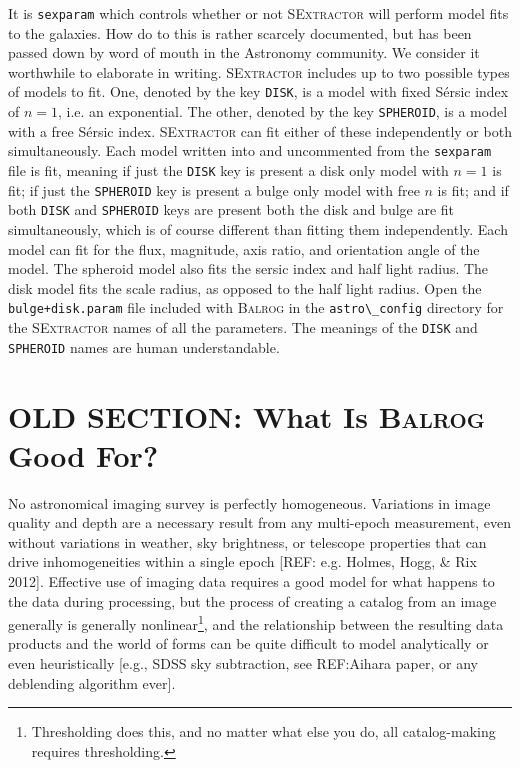 \documentclass[11pt]{book}
\newcommand{\codett}[1]{\lstinline{#1}}
\newcommand{\balrog}{\textsc{Balrog}}
\newcommand{\sex}{\textsc{SExtractor}}
\newcommand{\sersic}{S\'{e}rsic}
\begin{document}
It is \codett{sexparam} which controls whether or not \sex{} will perform model fits to the galaxies. 
How do to this is rather scarcely documented, but has been passed down by word of mouth in the Astronomy community. 
We consider it worthwhile to elaborate in writing.
\sex{} includes up to two possible types of models to fit.
One, denoted by the key \codett{DISK}, is a model with fixed \sersic{} index of $n=1$,
i.e. an exponential.
The other, denoted by the key \codett{SPHEROID}, is a model with a free \sersic{} index.
\sex{} can fit either of these independently or both simultaneously.
Each model written into and uncommented from the \codett{sexparam} file is fit,
meaning if just the \codett{DISK} key is present a disk only model with $n=1$ is fit;
if just the \codett{SPHEROID} key is present a bulge only model with free $n$ is fit;
and if both \codett{DISK} and \codett{SPHEROID} keys are present both the
disk and bulge are fit simultaneously, which is of course different than fitting them independently.
Each model can fit for the flux, magnitude, axis ratio, and orientation angle of the model.
The spheroid model also fits the sersic index and half light radius.
The disk model fits the scale radius, as opposed to the half light radius.
Open the \codett{bulge+disk.param} file included with \balrog{} in the \codett{astro\_config} directory
for the \sex{} names of all the parameters.
The meanings of the \codett{DISK} and \codett{SPHEROID} names are human understandable.


\section{OLD SECTION: What Is \balrog{} Good For?}
\label{sec:motivation}

No astronomical imaging survey is perfectly homogeneous. Variations in
image quality and depth are a necessary result from any multi-epoch
measurement, even without variations in weather, sky brightness, or
telescope properties that can drive inhomogeneities within a single
epoch [REF: e.g. Holmes, Hogg, \& Rix 2012]. Effective use of imaging
data requires a good model for what happens to the data during
processing, but the process of creating a catalog from an image
generally is generally nonlinear\footnote{Thresholding does this, and
  no matter what else you do, all catalog-making requires
  thresholding.}, and the relationship between the resulting
data products and the world of forms can be quite difficult to model
analytically or even heuristically [e.g., SDSS sky subtraction, see
REF:Aihara paper, or any deblending algorithm ever].
\end{document}

